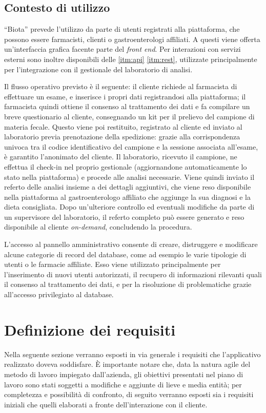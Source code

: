 \subsection{Contesto di utilizzo}
``Biota'' prevede l'utilizzo da parte di utenti registrati alla piattaforma, che possono essere farmacisti, clienti o gastroenterologi affiliati. A questi viene offerta un'interfaccia grafica facente parte del \textit{front end}. Per interazioni con servizi esterni sono inoltre disponibili delle \ref{itm:api} \ref{itm:rest}, utilizzate principalmente per l'integrazione con il gestionale del laboratorio di analisi. 

Il flusso operativo previsto è il seguente: il cliente richiede al farmacista di effettuare un esame, e inserisce i propri dati registrandosi alla piattaforma; il farmacista quindi ottiene il consenso al trattamento dei dati e fa compilare un breve questionario al cliente, consegnando un kit per il prelievo del campione di materia fecale. Questo viene poi restituito, registrato al cliente ed inviato al laboratorio previa prenotazione della spedizione: grazie alla corrispondenza univoca tra il codice identificativo del campione e la sessione associata all'esame, è garantito l'anonimato del cliente. Il laboratorio, ricevuto il campione, ne effettua il check-in nel proprio gestionale (aggiornandone automaticamente lo stato nella piattaforma) e procede alle analisi necessarie. Viene quindi inviato il referto delle analisi insieme a dei dettagli aggiuntivi, che viene reso disponibile nella piattaforma al gastroenterologo affiliato che aggiunge la sua diagnosi e la dieta consigliata. Dopo un'ulteriore controllo ed eventuali modifiche da parte di un supervisore del laboratorio, il referto completo può essere generato e reso disponibile al cliente \textit{on-demand}, concludendo la procedura.

L'accesso al pannello amministrativo consente di creare, distruggere e modificare alcune categorie di record del database, come ad esempio le varie tipologie di utenti o le farmacie affiliate. Esso viene utilizzato principalmente per l'inserimento di nuovi utenti autorizzati, il recupero di informazioni rilevanti quali il consenso al trattamento dei dati, e per la risoluzione di problematiche grazie all'accesso privilegiato al database.

\section{Definizione dei requisiti}
Nella seguente sezione verranno esposti in via generale i requisiti che l'applicativo realizzato doveva soddisfare. È importante notare che, data la natura agile del metodo di lavoro impiegato dall'azienda, gli obiettivi presentati nel piano di lavoro sono stati soggetti a modifiche e aggiunte di lieve e media entità; per completezza e possibilità di confronto, di seguito verranno esposti sia i requisiti iniziali che quelli elaborati a fronte dell'interazione con il cliente.
